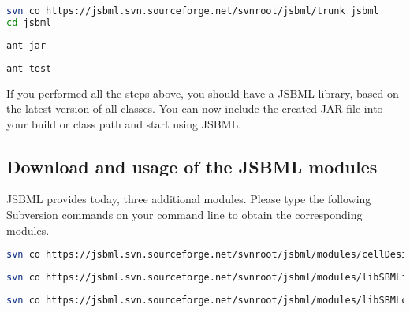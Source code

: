 \begin{lstlisting}[language=bash,numbers=none,float=h,captionpos=t,
title={Use the following command to download the latest JSBML classes (requires
Subversion\footref{fn:svn}):}]
svn co https://jsbml.svn.sourceforge.net/svnroot/jsbml/trunk jsbml
cd jsbml
\end{lstlisting}

\begin{lstlisting}[language=bash,numbers=none,float=h,captionpos=t,
title={To compile the JSBML library to a single JAR file, type the following
command (requires Apache Ant\footref{fn:ant}):}]
ant jar
\end{lstlisting}

\begin{lstlisting}[language=bash,numbers=none,float=h,captionpos=t,
title={If you want to run the JUnit tests on your compiled JAR file, please use
the following command:}]
ant test
\end{lstlisting}

If you performed all the steps above, you should have a JSBML library, based on
the latest version of all classes. You can now include the created JAR file into
your build or class path and start using JSBML.

\subsection{Download and usage of the JSBML modules}

JSBML provides today, three additional modules. Please type the following
Subversion commands on your command line to obtain the
corresponding modules.

\begin{lstlisting}[language=bash,numbers=none,float=h,captionpos=t,
title={The CellDesigner bridge-module should help CellDesigner plugin developers
to use JSBML as internal datastructure.}]
svn co https://jsbml.svn.sourceforge.net/svnroot/jsbml/modules/cellDesigner cellDesigner
\end{lstlisting}

\begin{lstlisting}[language=bash,numbers=none,float=h,captionpos=t,
title={Developers, who still want to make use of libSBML (e.g., to use the
SBML-validator), might want to have a look at the libSBML communication layer.}]
svn co https://jsbml.svn.sourceforge.net/svnroot/jsbml/modules/libSBMLio/ libSBMLio
\end{lstlisting}

\begin{lstlisting}[language=bash,numbers=none,float=h,captionpos=t,
title={The third module is a compatibility module to ease switching from libSBML
to JSBML.}]
svn co https://jsbml.svn.sourceforge.net/svnroot/jsbml/modules/libSBMLcompat libSBMLcompat
\end{lstlisting}

